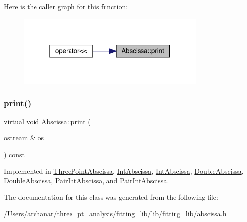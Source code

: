 Here is the caller graph for this function\+:
\nopagebreak
\begin{figure}[H]
\begin{center}
\leavevmode
\includegraphics[width=262pt]{dd/db2/classAbscissa_a98e122d32d82979bd30338abc15768fd_icgraph}
\end{center}
\end{figure}
\mbox{\label{classAbscissa_a98e122d32d82979bd30338abc15768fd}} 
\subsubsection{\texorpdfstring{print()}{print()}\hspace{0.1cm}{\footnotesize\ttfamily [2/2]}}
{\footnotesize\ttfamily virtual void Abscissa\+::print (\begin{DoxyParamCaption}\item[{ostream \&}]{os }\end{DoxyParamCaption}) const\hspace{0.3cm}{\ttfamily [pure virtual]}}



Implemented in \mbox{\hyperlink{classThreePointAbscissa_aa312b658c93628deb092f769246707af}{Three\+Point\+Abscissa}}, \mbox{\hyperlink{classIntAbscissa_af26b6be609db09fbe544502b6606cff8}{Int\+Abscissa}}, \mbox{\hyperlink{classIntAbscissa_af26b6be609db09fbe544502b6606cff8}{Int\+Abscissa}}, \mbox{\hyperlink{classDoubleAbscissa_a164c2a9d56e6c9454069c70d6593a39b}{Double\+Abscissa}}, \mbox{\hyperlink{classDoubleAbscissa_a164c2a9d56e6c9454069c70d6593a39b}{Double\+Abscissa}}, \mbox{\hyperlink{classPairIntAbscissa_aab7471f83b36cb5a16212902a30d8ce2}{Pair\+Int\+Abscissa}}, and \mbox{\hyperlink{classPairIntAbscissa_aab7471f83b36cb5a16212902a30d8ce2}{Pair\+Int\+Abscissa}}.



The documentation for this class was generated from the following file\+:\begin{DoxyCompactItemize}
\item 
/\+Users/archanar/three\+\_\+pt\+\_\+analysis/fitting\+\_\+lib/lib/fitting\+\_\+lib/\mbox{\hyperlink{lib_2fitting__lib_2abscissa_8h}{abscissa.\+h}}\end{DoxyCompactItemize}
